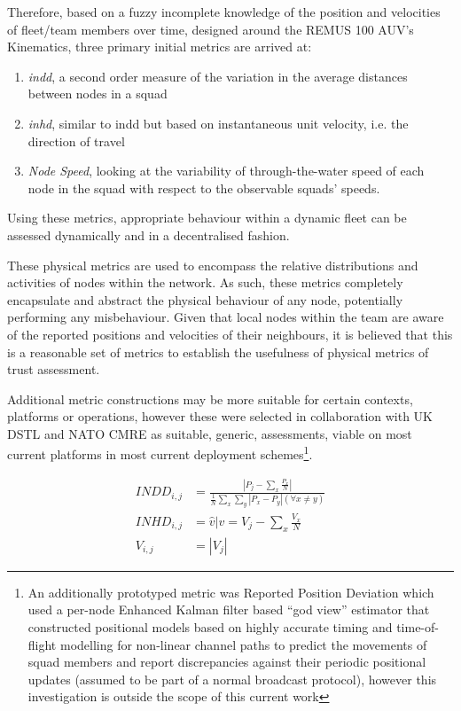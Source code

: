 Therefore, based on a fuzzy incomplete knowledge of the position and velocities of fleet/team members over time, designed around the REMUS 100 AUV’s Kinematics, three primary initial metrics are arrived at:
\pagebreak
\begin{enumerate}
\item \emph{\acrfull{indd}}, a second order measure of the variation in the average distances between nodes in a squad
\item \emph{\acrfull{inhd}}, similar to \gls{indd} but based on instantaneous unit velocity, i.e. the direction of travel
\item \emph{Node Speed}, looking at the variability of through-the-water speed of each node in the squad with respect to the observable squads’ speeds.
\end{enumerate}
Using these metrics, appropriate behaviour within a dynamic fleet can be assessed dynamically and in a decentralised fashion.

These physical metrics are used to encompass the relative distributions and activities of nodes within the network. 
As such, these metrics completely encapsulate and abstract the physical behaviour of any node, potentially performing any misbehaviour.
Given that local nodes within the team are aware of the reported positions and velocities of their neighbours, it is believed that this is a reasonable set of metrics to establish the usefulness of physical metrics of trust assessment.

Additional metric constructions may be more suitable for certain contexts, platforms or operations, however these were selected in collaboration with UK DSTL and NATO CMRE as suitable, generic, assessments, viable on most current platforms in most current deployment schemes\footnote{An additionally prototyped metric was Reported Position Deviation which used a per-node Enhanced Kalman filter based ``god view'' estimator that constructed positional models based on highly accurate timing and time-of-flight modelling for non-linear channel paths to predict the movements of squad members and report discrepancies against their periodic positional updates (assumed to be part of a normal broadcast protocol), however this investigation is outside the scope of this current work}.

\begin{align}
  INDD_{i,j} &= \frac{|P_j - \sum_x \frac{P_x}{N}|}{\frac{1}{N}\sum_x \sum_y{|P_x - P_y| (\forall x \neq y)}}\\
  INHD_{i,j} &= \hat{v} \vert v= V_j - \sum_x{\frac{V_x}{N}}\\
  V_{i,j} &= |V_j|
\end{align}

